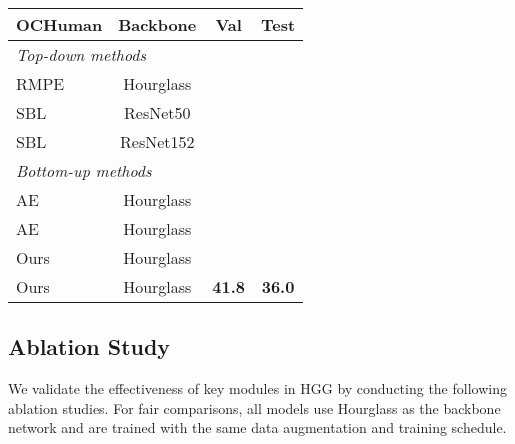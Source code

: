 \documentclass[runningheads]{llncs}
\begin{document}
\begin{table}[t]
\begin{subtable}[b]{0.45\textwidth}
			\caption{}
			\label{tab:coco_test_dev_all}
		\end{subtable}
		\quad
		\begin{subtable}[b]{0.5\textwidth}
			\centering
			\scriptsize
			\setlength{\tabcolsep}{2.0pt}
			\begin{tabular}{l|c|c|c}
				\hline
				OCHuman & Backbone &  Val & Test  \\
				\hline
				\multicolumn{4}{l}{\emph{Top-down methods}} \\ \hline
				RMPE~\cite{fang2017rmpe} & Hourglass & &  \\
				SBL~\cite{xiao2018simple} & ResNet50 & &  \\
				SBL~\cite{xiao2018simple} & ResNet152 & &  \\
				\hline
				\multicolumn{4}{l}{\emph{Bottom-up methods}} \\ \hline
				AE~\cite{newell2017associative} & Hourglass  & & \\
				AE~\cite{newell2017associative} & Hourglass & & \\
				Ours &  Hourglass & & \\
				Ours  & Hourglass  & \textbf{41.8} & \textbf{36.0}\\ \hline
			\end{tabular}
			\caption{}
			\label{tab:OChuman}
		\end{subtable}
	\end{table}
	
	
	\subsection{Ablation Study}
	We validate the effectiveness of key modules in HGG by conducting the following ablation studies. For fair comparisons, all models use Hourglass as the backbone network and are trained with the same data augmentation and training schedule.
	
\end{document}
